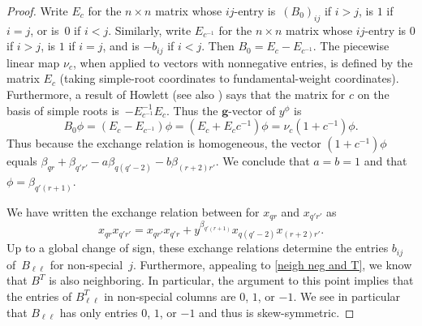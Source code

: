 \documentclass{amsart}
\theoremstyle{definition}
\theoremstyle{remark}
\numberwithin{equation}{section}
\newcommand{\0}{{\mathbf{0}}}
\newcommand{\g}{\mathbf{g}}
\begin{document}
\begin{proof}
Write $E_c$ for the $n\times n$ matrix whose $ij$-entry is~$(B_0)_{ij}$ if $i>j$, is $1$ if $i=j$, or is~$0$ if $i<j$.
Similarly, write $E_{c^{-1}}$ for the $n\times n$ matrix whose $ij$-entry is $0$ if $i>j$, is $1$ if $i=j$, and is $-b_{ij}$ if $i<j$.
Then $B_0=E_c-E_{c^{-1}}$.
The piecewise linear map $\nu_c$, when applied to vectors with nonnegative entries, is defined by the matrix $E_c$ (taking simple-root coordinates to fundamental-weight coordinates).
Furthermore, a result of Howlett \cite[Theorem~2.1]{Howlett} (see also \cite[Theorem~2.6]{affdenom}) says that the matrix for $c$ on the basis of simple roots is~$-E_{c^{-1}}^{-1}E_c$.
Thus the $\g$-vector of $y^\phi$ is 
\[B_0\phi=(E_c-E_{c^{-1}})\phi=(E_c+E_cc^{-1})\phi=\nu_c(1+c^{-1})\phi.\]
Thus because the exchange relation is homogeneous, the vector $(1+c^{-1})\phi$ equals $\beta_{qr}+\beta_{q'r'}-a\beta_{q(q'-2)}-b\beta_{(r+2)r'}$.
We conclude that $a=b=1$ and that $\phi=\beta_{q'(r+1)}$.

We have written the exchange relation between for $x_{qr}$ and $x_{q'r'}$ as 
\begin{equation}\label{exch rel eq}
x_{qr}x_{q'r'}=x_{qr'}x_{q'r}+y^{\beta_{q'(r+1)}}x_{q(q'-2)}x_{(r+2)r'}.
\end{equation}
Up to a global change of sign, these exchange relations determine the entries $b_{ij}$ of~$B_{\ell\ell}$ for non-special~$j$.
Furthermore, appealing to \cref{neigh neg and T}, we know that $B^T$ is also neighboring.
In particular, the argument to this point implies that the entries of $B_{\ell\ell}^T$ in non-special columns are $0$, $1$, or $-1$.
We see in particular that $B_{\ell\ell}$ has only entries $0$, $1$, or $-1$ and thus is skew-symmetric. %


\end{proof}
\end{document}
